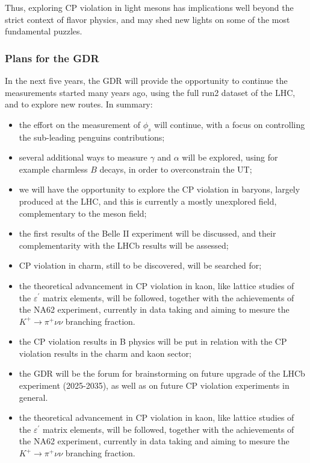 Thus, exploring CP violation in light mesons has implications well beyond the
strict context of flavor physics, and may shed new lights on some of the most
fundamental puzzles.





\subsubsection*{Plans for the GDR}
In the next five years, the GDR   will provide the opportunity to continue the measurements started many years ago, using the full run2 dataset of the LHC, and to explore new routes.  In summary:
\begin{itemize}
\item the effort on the measurement of $\phi_{s}$ will continue, with a focus on controlling the sub-leading penguins contributions;
\item several additional ways to measure $\gamma$ and $\alpha$ will be explored, using for example charmless $B$ decays, in order  to overconstrain the UT;
\item we will have the opportunity to explore the CP violation in baryons, largely produced at the LHC, and this is currently a mostly unexplored field, complementary to the meson field;
\item  the first results  of the Belle II experiment will be discussed, and  their complementarity with the LHCb results will be assessed;
\item CP violation in charm,  still to be discovered, will be searched for;
\item the theoretical advancement in CP violation in kaon, like  lattice studies of the $\varepsilon^{\prime}$ matrix elements, will be followed, together with the achievements of the  NA62 experiment, currently in data taking and aiming to mesure the  $K^{+}%
\rightarrow\pi^{+}\nu\nu$ branching fraction.
\item the CP violation results in B physics will be put in relation with the CP violation results in the charm and kaon sector; 
\item the GDR will be the forum for  brainstorming on future upgrade of the LHCb experiment (2025-2035), as well as on future CP violation experiments in general.
\item the theoretical advancement in CP violation in kaon, like  lattice studies of the $\varepsilon^{\prime}$ matrix elements, will be followed, together with the achievements of the  NA62 experiment, currently in data taking and aiming to mesure the  $K^{+}%
\rightarrow\pi^{+}\nu\nu$ branching fraction.
\end{itemize}

